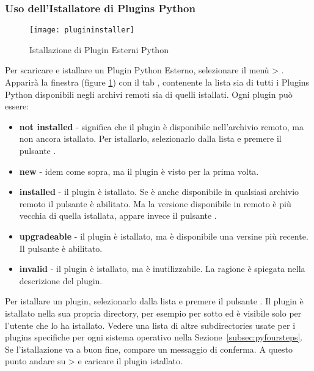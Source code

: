 \subsubsection{Uso dell'Istallatore di Plugins Python }\label{sec:python_plugin_installer}

\begin{figure}[ht]
   \begin{center}
   \caption{Istallazione di Plugin Esterni Python \nixcaption}
\label{fig:plugininstaller}\smallskip
   \texttt{[image: plugininstaller]}
\end{center}
\end{figure}

Per scaricare e istallare un Plugin Python Esterno, selezionare il menù  > .
Apparirà la finestra   (figure \ref{fig:plugininstaller}) con il tab , contenente la lista sia di tutti i Plugins Python disponibili negli archivi remoti sia di quelli istallati. Ogni plugin può essere:
\begin{itemize}
\item \textbf{not installed} - significa che il plugin è disponibile nell'archivio remoto, ma non ancora istallato. Per istallarlo, selezionarlo dalla lista e premere il pulsante  .
\item \textbf{new} - idem come sopra, ma il plugin è visto per la prima volta.
\item \textbf{installed} - il plugin è istallato. Se è anche disponibile in qualsiasi archivio remoto il pulsante  è abilitato. Ma la versione disponibile in remoto è più vecchia di quella istallata, appare invece il pulsante .
\item \textbf{upgradeable} - il plugin è istallato, ma è disponibile una versine più recente. Il pulsante  è abilitato.
\item \textbf{invalid} - il plugin è istallato, ma è inutilizzabile. La ragione è spiegata nella descrizione del plugin.
\end{itemize}


Per istallare un plugin, selezionarlo dalla lista e premere il pulsante  . Il plugin è istallato nella sua propria directory, per esempio per \nix sotto  ed è visibile solo per l'utente che lo ha istallato. Vedere una lista di altre subdirectories usate per i plugins specifiche per ogni sistema operativo nella Sezione~\ref{subsec:pyfoursteps}. Se l'istallazione va a buon fine, compare un messaggio di conferma. A questo punto andare su  >  e caricare il plugin istallato.

